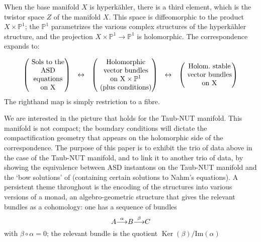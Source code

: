 \documentclass[12pt]{article}
\theoremstyle{definition}
\theoremstyle{remark}
\numberwithin{theorem}{section}
\def\bP{{\mathbb {P}}}
\renewcommand{\ker}{\mathop{\mathrm{Ker}}\nolimits}
\begin{document}
When the base manifold $X$ is hyperk\"ahler, there is a third element, which is the twistor space $Z$ of the manifold $X$. This space is diffeomorphic to the product $X\times \bP^1$; the $\bP^1$ parametrizes the various complex structures of the hyperk\"ahler structure, and the projection  $X\times \bP^1\rightarrow \bP^1$ is holomorphic. The correspondence expands to:

$$\begin{matrix} \begin{pmatrix} {\rm \ Sols\ to\ the}\\ {\rm \ ASD }\\ \ {\rm equations}\\ \ {\rm on\ X}  \end{pmatrix} & \leftrightarrow & \begin{pmatrix} {\rm \ Holomorphic}\\ \ {\rm vector\ bundles} \\ \ {\rm on\ X}\times \bP^1 \\ \ {\rm (plus\ conditions)}\end{pmatrix}& \leftrightarrow & \begin{pmatrix} {\rm \ Holom.\ stable}\\ \ {\rm vector\ bundles} \\ \ {\rm on\ X} \end{pmatrix}\end{matrix}$$
The righthand map is simply restriction to a fibre. 

We are interested in the picture that holds for the Taub-NUT manifold. This manifold is not compact; the boundary conditions  will dictate the compactification geometry that appears on the holomorphic side of the correspondence.  The purpose of this paper  is to exhibit the trio of data above in the case of the Taub-NUT manifold, and to link it to another trio of data, by showing the equivalence between ASD instantons on the Taub-NUT manifold and the `bow solutions' of \cite{Cherkis:2010bn} (containing certain solutions to Nahm's equations). A persistent theme throughout is the encoding of the structures into various versions of a monad, an algebro-geometric structure that gives the relevant bundles as a cohomology: one has a sequence of  bundles
$$ A{\buildrel{\alpha}\over{\longrightarrow}}B{\buildrel{\beta}\over{\longrightarrow}}C$$
with $\beta\circ\alpha = 0$; the relevant bundle is the quotient
$\ker(\beta)/{\mathrm {Im}}({\alpha})$
\end{document}
